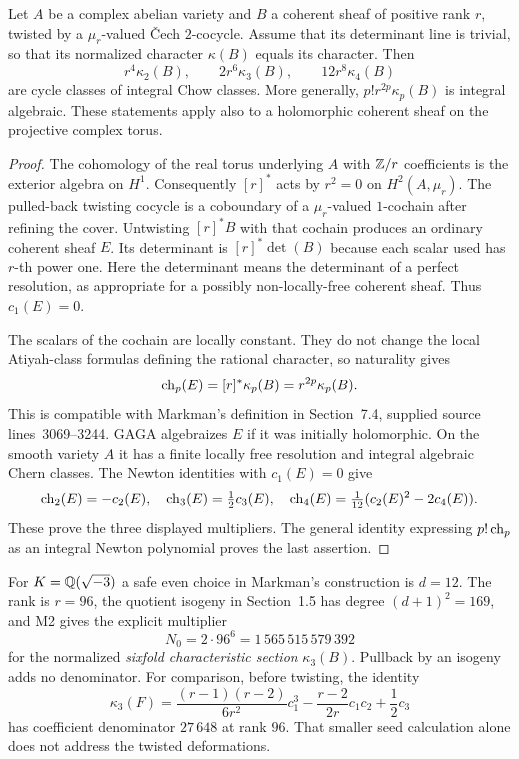 \begin{proposition}\label{M2}
Let $A$ be a complex abelian variety and $B$ a coherent sheaf of positive rank $r$, twisted by a $\mu_r$-valued \v Cech $2$-cocycle. Assume that its determinant line is trivial, so that its normalized character $\kappa(B)$ equals its character. Then
\[
 r^4\kappa_2(B),\qquad 2r^6\kappa_3(B),\qquad
 12r^8\kappa_4(B)
\]
are cycle classes of integral Chow classes. More generally, $p!r^{2p}\kappa_p(B)$ is integral algebraic. These statements apply also to a holomorphic coherent sheaf on the projective complex torus.
\end{proposition}
\begin{proof}
The cohomology of the real torus underlying $A$ with $\mathbb Z/r$ coefficients is the exterior algebra on $H^1$. Consequently $[r]^*$ acts by $r^2=0$ on $H^2(A,\mu_r)$. The pulled-back twisting cocycle is a coboundary of a $\mu_r$-valued $1$-cochain after refining the cover. Untwisting $[r]^*B$ with that cochain produces an ordinary coherent sheaf $E$. Its determinant is $[r]^*\det(B)$ because each scalar used has $r$-th power one. Here the determinant means the determinant of a perfect resolution, as appropriate for a possibly non-locally-free coherent sheaf. Thus $c_1(E)=0$.

The scalars of the cochain are locally constant. They do not change the local Atiyah-class formulas defining the rational character, so naturality gives
\[
 \operatorname{ch}_p(E)=[r]^*\kappa_p(B)=r^{2p}\kappa_p(B).
\]
This is compatible with Markman's definition in Section~7.4, supplied source lines~3069--3244. GAGA algebraizes $E$ if it was initially holomorphic. On the smooth variety $A$ it has a finite locally free resolution and integral algebraic Chern classes. The Newton identities with $c_1(E)=0$ give
\[
 \operatorname{ch}_2(E)=-c_2(E),\quad \operatorname{ch}_3(E)=\tfrac12c_3(E),\quad
 \operatorname{ch}_4(E)=\tfrac1{12}(c_2(E)^2-2c_4(E)).
\]
These prove the three displayed multipliers. The general identity expressing $p!\operatorname{ch}_p$ as an integral Newton polynomial proves the last assertion.
\end{proof}

For $K=\mathbb Q(\sqrt{-3})$ a safe even choice in Markman's construction is $d=12$. The rank is $r=96$, the quotient isogeny in Section~1.5 has degree $(d+1)^2=169$, and M2 gives the explicit multiplier
\begin{equation}\label{eq:markmanN}
 N_0=2\cdot96^6=1\,565\,515\,579\,392
\end{equation}
for the normalized \emph{sixfold characteristic section} $\kappa_3(B)$. Pullback by an isogeny adds no denominator. For comparison, before twisting, the identity
\[
 \kappa_3(F)=\frac{(r-1)(r-2)}{6r^2}c_1^3
 -\frac{r-2}{2r}c_1c_2+\frac12c_3
\]
has coefficient denominator $27\,648$ at rank $96$. That smaller seed calculation alone does not address the twisted deformations.

